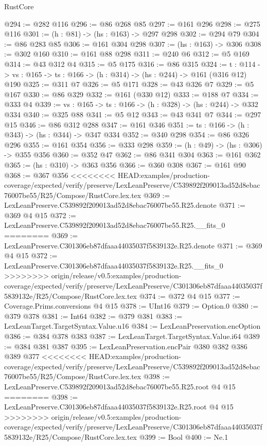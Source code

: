 \begin{lexlean}{RustCore}
\begin{coremodule}
{\begin{coremodule}
@294 := @282 @116
@296 := @86 @268 @85
@297 := @161 @296
@298 := @275 @116
@301 := (h : @81) -> (hs : @163) -> @297 @298
@302 := @294 @79
@304 := @86 @283 @85
@306 := @161 @304 @298
@307 := (hs : @163) -> @306
@308 := @302 @160
@310 := @161 @88 @298
@311 := @240 @6
@312 := @5 @169
@314 := @43 @312 @4
@315 := @5 @175
@316 := @86 @315
@324 := {t : @114} ->
  {vs : @165} -> {ts : @166} -> (h : @314) -> (hs : @244) -> @161 (@316 @12) @190
@325 := @311 @7
@326 := @5 @171
@328 := @43 @326 @7
@329 := @5 @167
@330 := @86 @329
@332 := @161 (@330 @12)
@333 := @188 @7
@334 := @333 @4
@339 := {vs : @165} -> {ts : @166} -> (h : @328) -> (hs : @244) -> @332 @334
@340 := @325 @88
@341 := @5 @12
@343 := @43 @341 @7
@344 := @297 @15
@346 := @86 @312 @288
@347 := @161 @346
@351 := {ts : @166} -> (h : @343) -> (hs : @344) -> @347 @334
@352 := @340 @298
@354 := @86 @326 @296
@355 := @161 @354
@356 := @333 @298
@359 := (h : @49) -> (hs : @306) -> @355 @356
@360 := @352 @47
@362 := @86 @341 @304
@363 := @161 @362
@365 := (hs : @310) -> @363 @356
@366 := @360 @308
@367 := @161 @90
@368 := @367 @356
<<<<<<<< HEAD:examples/production-coverage/expected/verify/preserve/LexLeanPreserve/C539892f209013ad52d8ebac76007be55/R25/Compose/RustCore.lex.tex
@369 := LexLeanPreserve.C539892f209013ad52d8ebac76007be55.R25.denote
@371 := @369 @4 @15
@372 := LexLeanPreserve.C539892f209013ad52d8ebac76007be55.R25.__fits_0
========
@369 := LexLeanPreserve.C301306eb87dfaaa44035037f5839132e.R25.denote
@371 := @369 @4 @15
@372 := LexLeanPreserve.C301306eb87dfaaa44035037f5839132e.R25.__fits_0
>>>>>>>> origin/release/v0.5:examples/production-coverage/expected/verify/preserve/LexLeanPreserve/C301306eb87dfaaa44035037f5839132e/R25/Compose/RustCore.lex.tex
@374 := @372 @4 @15
@377 := Coverage.Prims.conversions @4 @15
@378 := UInt16
@379 := Option.{0}
@380 := @379 @378
@381 := Int64
@382 := @379 @381
@383 := LexLeanTarget.TargetSyntax.Value.u16
@384 := LexLeanPreservation.encOption
@386 := @384 @378 @383
@387 := LexLeanTarget.TargetSyntax.Value.i64
@389 := @384 @381 @387
@395 := LexLeanPreservation.encPair @380 @382 @386 @389 @377
<<<<<<<< HEAD:examples/production-coverage/expected/verify/preserve/LexLeanPreserve/C539892f209013ad52d8ebac76007be55/R25/Compose/RustCore.lex.tex
@398 := LexLeanPreserve.C539892f209013ad52d8ebac76007be55.R25.root @4 @15
========
@398 := LexLeanPreserve.C301306eb87dfaaa44035037f5839132e.R25.root @4 @15
>>>>>>>> origin/release/v0.5:examples/production-coverage/expected/verify/preserve/LexLeanPreserve/C301306eb87dfaaa44035037f5839132e/R25/Compose/RustCore.lex.tex
@399 := Bool
@400 := Ne.{1}

\end{coremodule}}
\end{coremodule}
\end{lexlean}

